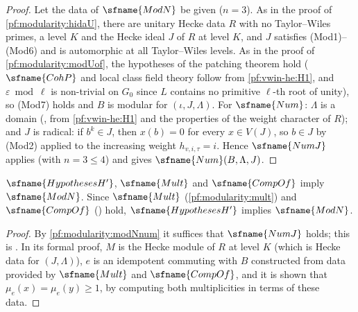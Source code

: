 \begin{proof}
Let the data of $\sfname{ModN}$ be given ($n=3$). As in the proof of \cref{pf:modularity:hidaU}, there are unitary Hecke
data $R$ with no Taylor--Wiles primes, a level $K$ and the Hecke ideal $J$ of $R$ at level $K$, and $J$ satisfies
(Mod1)--(Mod6) and is automorphic at all Taylor--Wiles levels. As in the proof of \cref{pf:modularity:modUof}, the hypotheses of
the patching theorem hold ($\sfname{CohP}$ and local class field theory follow from \ref{pf:vwin-he:H1}, and
$\varepsilon\bmod\ell$ is non-trivial on $G_0$ since $L$ contains no primitive $\ell$-th root of unity), so (Mod7) holds and
$B$ is modular for $(\iota,J,\Lambda)$. For $\sfname{Num}$: $\Lambda$ is a domain
(, from \ref{pf:vwin-he:H1} and the properties of the weight
character of $R$); and $J$ is radical: if $b^k\in J$, then $x(b)=0$ for every $x\in V(J)$, so $b\in J$ by (Mod2) applied to the
increasing weight $h_{v,i,\tau}=i$. Hence $\sfname{NumJ}$ applies (with $n=3\le4$) and gives $\sfname{Num}(B,\Lambda,J)$.
\end{proof}

\begin{theorem}\label{pf:modularity:modN}
$\sfname{HypothesesH'}$, $\sfname{Mult}$ and $\sfname{CompOf}$ imply $\sfname{ModN}$. Since $\sfname{Mult}$
(\cref{pf:modularity:mult}) and $\sfname{CompOf}$ () hold,
$\sfname{HypothesesH'}$ implies $\sfname{ModN}$.
\end{theorem}

\begin{proof}
By \cref{pf:modularity:modNnum} it suffices that $\sfname{NumJ}$ holds; this is .
In its formal proof, $M$ is the Hecke module of $R$ at level $K$ (which is Hecke data for $(J,\Lambda)$), $e$ is an idempotent
commuting with $B$ constructed from data provided by $\sfname{Mult}$ and $\sfname{CompOf}$, and it is shown that
$\mu_e(x)=\mu_e(y)\ge1$, by computing both multiplicities in terms of these data.
\end{proof}

